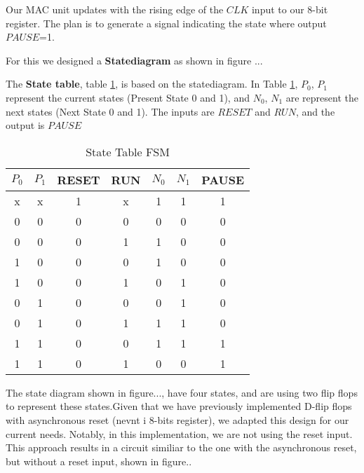 Our MAC unit updates with the rising edge of the $CLK$ input to our 8-bit register. The plan is to generate a signal indicating the state where output $PAUSE$=1.

For this we designed a \textbf{Statediagram} as shown in figure ... 


The \textbf{State table}, table \ref{State Table FSM}, is based on the statediagram. In Table \ref{State Table FSM}, $P_{0}$, $P_{1}$ represent the current states (Present State 0 and 1),  and $N_{0}$, $N_{1}$ are represent the next states (Next State 0 and 1). The inputs are $RESET$ and $RUN$, and the output is $PAUSE$

\begin{table}[H]
    \centering
    \caption{State Table FSM}
    \label{State Table FSM}
    \begin{tabular}{|c|c|c|c|c|c|c|}
        \hline
        $P_{0}$ & $P_{1}$ & RESET & RUN & $N_{0}$ & $N_{1}$ & PAUSE \\
        \hline
        x    & x    & 1     & x   & 1    & 1    & 1     \\
        0    & 0    & 0     & 0   & 0    & 0    & 0     \\
        0    & 0    & 0     & 1   & 1    & 0    & 0     \\
        1    & 0    & 0     & 0   & 1    & 0    & 0     \\
        1    & 0    & 0     & 1   & 0    & 1    & 0     \\
        0    & 1    & 0     & 0   & 0    & 1    & 0     \\
        0    & 1    & 0     & 1   & 1    & 1    & 0     \\
        1    & 1    & 0     & 0   & 1    & 1    & 1     \\
        1    & 1    & 0     & 1   & 0    & 0    & 1     \\
        \hline
        
    \end{tabular}
    \end{table}



The state diagram shown in figure..., have four states, and are using two flip flops to represent these states.Given that we have previously implemented D-flip flops with asynchronous reset (nevnt i 8-bits register), we adapted this design for our current needs. Notably, in this implementation, we are not using the reset input. This approach results in a circuit similiar to the one with the asynchronous reset, but without a reset input, shown in figure..

